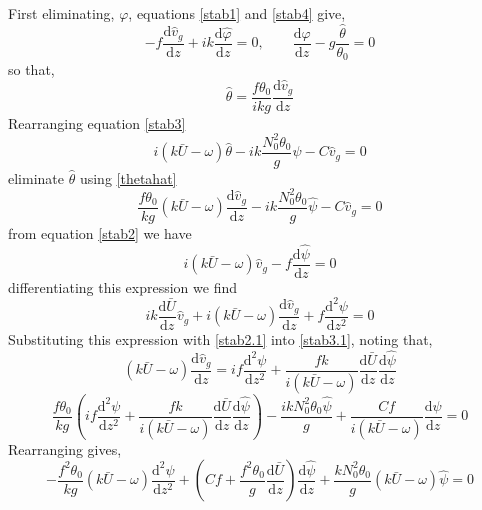 First eliminating, $\varphi$, equations \ref{stab1} and \ref{stab4} give,
\begin{equation}
	-f\frac{\text{d}\hat{v}_g}{\text{d}z}+ik\frac{\text{d}\hat{\varphi}}{\text{d}z} = 0, \qquad \frac{\text{d}\hat{\varphi}}{\text{d}z} - g\frac{\hat{\theta}}{\theta_0} = 0
\end{equation}
so that,
\begin{equation}
	\hat{\theta} = \frac{f\theta_0}{ikg} \frac{\text{d}\hat{v}_g}{\text{d}z}
\label{thetahat}
\end{equation}
Rearranging equation \ref{stab3}
\begin{equation}
	 i\left( k \bar{U} - \omega \right) \hat{\theta} - ik\frac{N_0^2\theta_0}{g} \hat{\psi} - C\hat{v}_g = 0
\label{stab3.1}
\end{equation}
eliminate $\hat{\theta}$ using \ref{thetahat}
\begin{equation}
	\frac{f\theta_0}{kg}\left( k \bar{U} - \omega \right)  \frac{\text{d}\hat{v}_g}{\text{d}z} - ik\frac{N_0^2\theta_0}{g} \hat{\psi} - C\hat{v}_g = 0
\label{vg}
\end{equation}
from equation \ref{stab2} we have
\begin{equation}
i\left( k \bar{U} - \omega \right) \hat{v}_g - f \frac{\text{d}\hat{\psi}}{\text{d}z} = 0
\label{stab2.1}
\end{equation}
differentiating this expression we find
\begin{equation*}
	ik \frac{\text{d}\bar{U}}{\text{d}z} \hat{v}_g + i(k\bar{U}-\omega)\frac{\text{d}\hat{v}_g}{\text{d}z} + f\frac{\text{d}^2{\psi}}{\text{d}z^2} = 0 
\end{equation*}
Substituting this expression with \ref{stab2.1} into \ref{stab3.1}, noting that,
\begin{equation*}
	(k\bar{U}-\omega)\frac{\text{d}\hat{v}_g}{\text{d}z} = if\frac{\text{d}^2{\psi}}{\text{d}z^2} + \frac{fk}{i(k\bar{U}-\omega)}\frac{\text{d}\bar{U}}{\text{d}z}\frac{\text{d}\hat{\psi}}{\text{d}z}
\end{equation*}
\begin{equation*}
	\frac{f\theta_0}{kg}\left(if\frac{\text{d}^2{\psi}}{\text{d}z^2} + \frac{fk}{i(k\bar{U}-\omega)}\frac{\text{d}\bar{U}}{\text{d}z}\frac{\text{d}\hat{\psi}}{\text{d}z}\right) - \frac{ik N_0^2\theta_0\hat{\psi}}{g} + \frac{Cf}{i(k\bar{U}-\omega)}\frac{\text{d}\psi}{\text{d}z} =0
\end{equation*}
Rearranging gives,
\begin{equation*}
	-\frac{f^2\theta_0}{kg}(k\bar{U}-\omega)\frac{\text{d}^2{\psi}}{\text{d}z^2}+\left(Cf+\frac{f^2\theta_0}{g}\frac{\text{d}\bar{U}}{\text{d}z}\right)\frac{\text{d}\hat{\psi}}{\text{d}z}+\frac{k N_0^2\theta_0}{g}(k\bar{U}-\omega)\hat{\psi}=0
\end{equation*}
